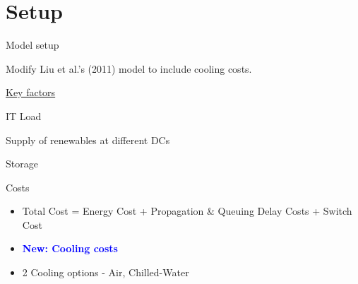 \documentclass[xcolor=dvipsnames]{beamer}
\begin{document}
\section{Setup}

\begin{frame}{Model setup}

Modify Liu et al.'s (2011) %
model to include cooling costs.

\vspace{3mm}
\begin{block}{\underline{Key factors}}
\end{block}
\vspace{-2mm}
	
\begin{block}{IT Load}
\end{block}
\vspace{-2mm}

 \begin{block}{Supply of renewables at different DCs}
\end{block}
\vspace{-2mm}

\begin{block}{Storage}
\end{block}
\vspace{-2mm}

\begin{block}{Costs} 
	\begin{itemize}
		\item Total Cost = Energy Cost + Propagation \& Queuing Delay Costs + Switch Cost
		\item {\bf \textcolor{blue}{New: Cooling costs}}
		\item 2 Cooling options - Air, Chilled-Water 
	\end{itemize}
\end{block}

\end{frame}
\end{document}
